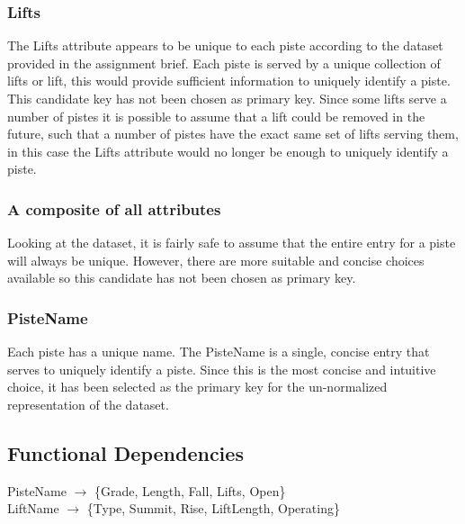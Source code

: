 \documentclass[titlepage ,12pt]{article}
\begin{document}
\subsubsection{Lifts}

The Lifts attribute appears to be unique to each piste according to the dataset provided in the assignment brief. Each piste is served by a unique collection of lifts or lift, this would provide sufficient information to uniquely identify a piste. \\
This candidate key has not been chosen as primary key. Since some lifts serve a number of pistes it is possible to assume that a lift could be removed in the future, such that a number of pistes have the exact same set of lifts serving them, in this case the Lifts attribute would no longer be enough to uniquely identify a piste.

\subsubsection{A composite of all attributes}

Looking at the dataset, it is fairly safe to assume that the entire entry for a piste will always be unique. However, there are more suitable and concise choices available so this candidate has not been chosen as primary key.

\subsubsection{PisteName}

Each piste has a unique name. The PisteName is a single, concise entry that serves to uniquely identify a piste. Since this is the most concise and intuitive choice, it has been selected as the primary key for the un-normalized representation of the dataset. 


\subsection{Functional Dependencies}

PisteName \begin{math}\rightarrow\end{math} \{Grade, Length, Fall, Lifts, Open\} \\
LiftName \begin{math}\rightarrow\end{math} \{Type, Summit, Rise, LiftLength, Operating\}
 
\end{document}
